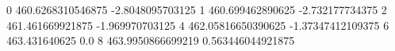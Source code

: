 0 460.6268310546875 -2.8048095703125
1 460.699462890625 -2.732177734375
2 461.461669921875 -1.969970703125
4 462.05816650390625 -1.37347412109375
6 463.431640625 0.0
8 463.9950866699219 0.563446044921875
